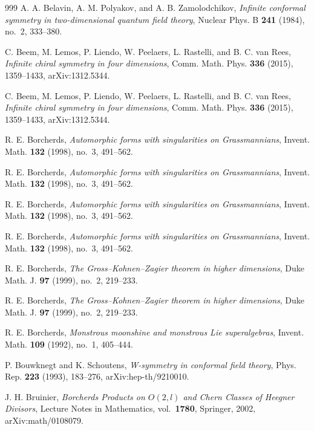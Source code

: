 \begin{thebibliography}{999}
A. A. Belavin, A. M. Polyakov, and A. B. Zamolodchikov, \emph{Infinite conformal symmetry in two-dimensional quantum field theory}, Nuclear Phys. B \textbf{241} (1984), no.~2, 333--380.

C. Beem, M. Lemos, P. Liendo, W. Peelaers, L. Rastelli, and B. C. van Rees, \emph{Infinite chiral symmetry in four dimensions}, Comm. Math. Phys. \textbf{336} (2015), 1359--1433, arXiv:1312.5344.

C. Beem, M. Lemos, P. Liendo, W. Peelaers, L. Rastelli, and B. C. van Rees, \emph{Infinite chiral symmetry in four dimensions}, Comm. Math. Phys. \textbf{336} (2015), 1359--1433, arXiv:1312.5344.

R. E. Borcherds, \emph{Automorphic forms with singularities on Grassmannians}, Invent. Math. \textbf{132} (1998), no.~3, 491--562.

R. E. Borcherds, \emph{Automorphic forms with singularities on Grassmannians}, Invent. Math. \textbf{132} (1998), no.~3, 491--562.

R. E. Borcherds, \emph{Automorphic forms with singularities on Grassmannians}, Invent. Math. \textbf{132} (1998), no.~3, 491--562.

R. E. Borcherds, \emph{Automorphic forms with singularities on Grassmannians}, Invent. Math. \textbf{132} (1998), no.~3, 491--562.

R. E. Borcherds, \emph{The Gross--Kohnen--Zagier theorem in higher dimensions}, Duke Math. J. \textbf{97} (1999), no.~2, 219--233.

R. E. Borcherds, \emph{The Gross--Kohnen--Zagier theorem in higher dimensions}, Duke Math. J. \textbf{97} (1999), no.~2, 219--233.

R. E. Borcherds, \emph{Monstrous moonshine and monstrous Lie superalgebras}, Invent. Math. \textbf{109} (1992), no.~1, 405--444.

P. Bouwknegt and K. Schoutens, \emph{W-symmetry in conformal field theory}, Phys. Rep. \textbf{223} (1993), 183--276, arXiv:hep-th/9210010.

J. H. Bruinier, \emph{Borcherds Products on $O(2,l)$ and Chern Classes of Heegner Divisors}, Lecture Notes in Mathematics, vol.~\textbf{1780}, Springer, 2002, arXiv:math/0108079.


\end{thebibliography}
